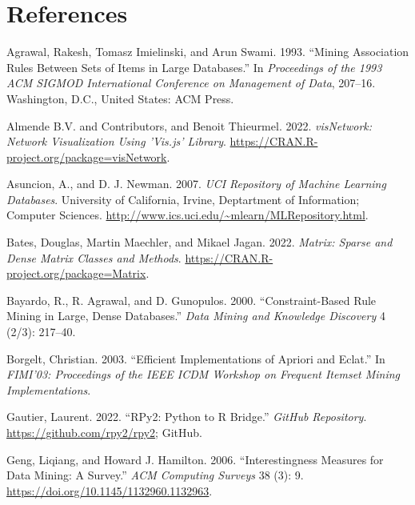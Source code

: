 \documentclass{article}
\newlength{\cslhangindent}
\newlength{\cslentryspacingunit} %
\newenvironment{CSLReferences}[2] %
 {%
  \setlength{\parindent}{0pt}
  \ifodd #1
  \let\oldpar\par
  \def\par{\hangindent=\cslhangindent\oldpar}
  \fi
  \setlength{\parskip}{#2\cslentryspacingunit}
 }%
 {}
\begin{document}
\hypertarget{references}{%
\section*{References}\label{references}}

\hypertarget{refs}{}
\begin{CSLReferences}{1}{0}
\leavevmode{}%
Agrawal, Rakesh, Tomasz Imielinski, and Arun Swami. 1993. {``Mining
Association Rules Between Sets of Items in Large Databases.''} In
\emph{Proceedings of the 1993 ACM SIGMOD International Conference on
Management of Data}, 207--16. Washington, D.C., United States: ACM
Press.

\leavevmode{}%
Almende B.V. and Contributors, and Benoit Thieurmel. 2022.
\emph{visNetwork: Network Visualization Using 'Vis.js' Library}.
\url{https://CRAN.R-project.org/package=visNetwork}.

\leavevmode{}%
Asuncion, A., and D. J. Newman. 2007. \emph{{UCI} Repository of Machine
Learning Databases}. University of California, Irvine, Deptartment of
Information; Computer Sciences.
\url{http://www.ics.uci.edu/~mlearn/MLRepository.html}.

\leavevmode{}%
Bates, Douglas, Martin Maechler, and Mikael Jagan. 2022. \emph{Matrix:
{S}parse and Dense Matrix Classes and Methods}.
\url{https://CRAN.R-project.org/package=Matrix}.

\leavevmode{}%
Bayardo, R., R. Agrawal, and D. Gunopulos. 2000. {``Constraint-Based
Rule Mining in Large, Dense Databases.''} \emph{Data Mining and
Knowledge Discovery} 4 (2/3): 217--40.

\leavevmode{}%
Borgelt, Christian. 2003. {``Efficient Implementations of {Apriori} and
{Eclat}.''} In \emph{FIMI'03: Proceedings of the IEEE ICDM Workshop on
Frequent Itemset Mining Implementations}.

\leavevmode{}%
Gautier, Laurent. 2022. {``{RPy2}: {P}ython to {R} Bridge.''}
\emph{GitHub Repository}. \url{https://github.com/rpy2/rpy2}; GitHub.

\leavevmode{}%
Geng, Liqiang, and Howard J. Hamilton. 2006. {``Interestingness Measures
for Data Mining: A Survey.''} \emph{ACM Computing Surveys} 38 (3): 9.
\url{https://doi.org/10.1145/1132960.1132963}.


\end{CSLReferences}
\end{document}
